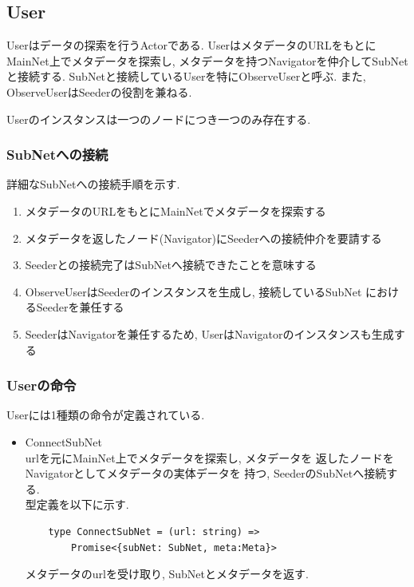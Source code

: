 \documentclass[sotsuron]{jcsie}
\begin{document}
\subsection{User}
Userはデータの探索を行うActorである.
UserはメタデータのURLをもとにMainNet上でメタデータを探索し, 
メタデータを持つNavigatorを仲介してSubNetと接続する.
SubNetと接続しているUserを特にObserveUserと呼ぶ.
また, ObserveUserはSeederの役割を兼ねる.

Userのインスタンスは一つのノードにつき一つのみ存在する.

\subsubsection{SubNetへの接続}
詳細なSubNetへの接続手順を示す.
\begin{enumerate}
	\item メタデータのURLをもとにMainNetでメタデータを探索する
	\item メタデータを返したノード(Navigator)にSeederへの接続仲介を要請する
	\item Seederとの接続完了はSubNetへ接続できたことを意味する
	\item 
	      ObserveUserはSeederのインスタンスを生成し, 接続しているSubNet
	      におけるSeederを兼任する
	\item SeederはNavigatorを兼任するため, 
		  UserはNavigatorのインスタンスも生成する
\end{enumerate}

\subsubsection{Userの命令}
Userには1種類の命令が定義されている.
\begin{itemize}
	\item {ConnectSubNet}\\
	      urlを元にMainNet上でメタデータを探索し, メタデータを
	      返したノードをNavigatorとしてメタデータの実体データを
	      持つ, SeederのSubNetへ接続する.\\
	      	      	      	      
	      型定義を以下に示す.
	      \begin{lstlisting}
	type ConnectSubNet = (url: string) =>
		Promise<{subNet: SubNet, meta:Meta}>
	      \end{lstlisting}
	      	      	      	      
	      メタデータのurlを受け取り, 
	      SubNetとメタデータを返す.
\end{itemize}
\end{document}
